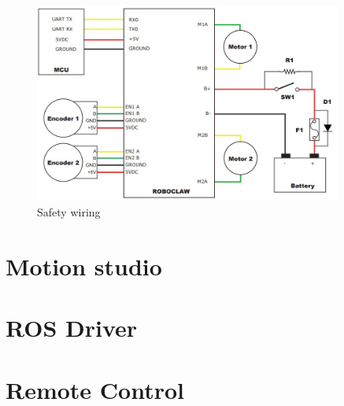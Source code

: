 \documentclass[12pt,letterpaper,oneside]{article}
\begin{document}
\newpage
\begin{figure}[h]
    \centering
    \includegraphics[width=0.9\textwidth]{figures/wiring.jpg}
    \caption{Safety wiring}
    \label{fig:my_label}
\end{figure}

\section{Motion studio}

\section{ROS Driver}

\section{Remote Control}

\printbibliography
\end{document}
